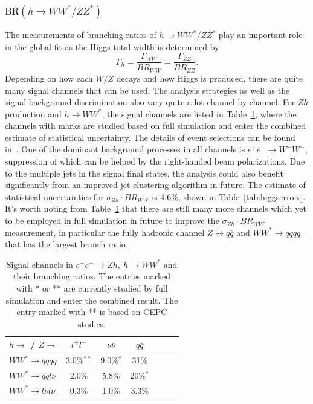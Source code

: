 \subsubsection{$\mathrm{BR}(h\to WW^*/ZZ^*)$}
The measurements of branching ratios of $h\to WW^*/ZZ^*$ play an important role
in the global fit as the Higgs total width is determined by
$$\Gamma_h=\frac{\Gamma_{WW}}{BR_{WW}}=\frac{\Gamma_{ZZ}}{BR_{ZZ}}.$$
Depending on how each $W/Z$ decays and how Higgs is produced, there
are quite many signal channels that can be used. The analysis strategies as well as
the signal background discrimination also vary quite a lot channel by channel.
For $Zh$ production and $h\to WW^*$, 
the signal channels are listed in Table~\ref{tab:ZhWWchannels}, where the channels
with marks are studied based on full simulation and enter the combined estimate of 
statistical uncertainty. The details of event selections can be found in~\cite{Ono:2012,Barklow:2017,Liao:2017}.
One of the dominant background processes in all channels is $e^+e^-\to W^+W^-$, suppression of which 
can be helped by the right-handed beam polarizations.
Due to the multiple jets in the signal final states, the analysis could also benefit significantly 
from an improved jet clustering algorithm in future.
The estimate of statistical uncertainties for $\sigma_{Zh}\cdot BR_{WW}$ is
4.6\%, shown in Table~\ref{tab:higgserrors}. It's worth noting from Table~\ref{tab:ZhWWchannels}
that there are still many more channels which yet to be employed in full simulation in future 
to improve the $\sigma_{Zh}\cdot BR_{WW}$ measurement, in particular the fully hadronic channel 
 $Z\to q\bar{q}$ and $WW^*\to qqqq$ that has the largest branch ratio.

\begin{table}
\begin{center}
\begin{tabular} {lcccccc}
$h\to$ / $Z\to$  & $l^+l^-$ &  $\nu\bar{\nu}$ & $q\bar{q}$ \\
\hline
$WW^*\to qqqq$        & 3.0\%$^{**}$    & 9.0\%$^{*}$   & 31\% \\
$WW^*\to qql\nu$      & 2.0\%    & 5.8\%    & 20\%$^{*}$ \\
$WW^*\to l\nu l\nu$   & 0.3\%    & 1.0\%    & 3.3\%
\end{tabular}
\caption{Signal channels in $e^+e^-\to Zh,~h\to WW^*$ and their branching ratios. 
The entries marked with * or ** are currently studied by full simulation and enter the combined result. 
The entry marked with ** is based on CEPC studies.}
\label{tab:ZhWWchannels}
\end{center}
\end{table}


